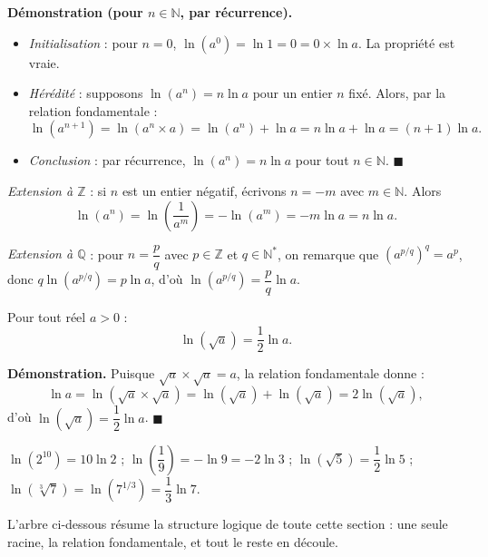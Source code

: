 \documentclass[11pt]{article}
\begin{document}
\textbf{Démonstration (pour $n \in \mathbb{N}$, par récurrence).}
\begin{itemize}
\item \emph{Initialisation} : pour $n = 0$, $\ln(a^0) = \ln 1 = 0 = 0 \times \ln a$. La propriété est vraie.
\item \emph{Hérédité} : supposons $\ln(a^n) = n\ln a$ pour un entier $n$ fixé. Alors, par la relation fondamentale :
\[
\ln(a^{n+1}) = \ln(a^n \times a) = \ln(a^n) + \ln a = n\ln a + \ln a = (n+1)\ln a.
\]
\item \emph{Conclusion} : par récurrence, $\ln(a^n) = n\ln a$ pour tout $n \in \mathbb{N}$. \hfill$\blacksquare$
\end{itemize}

\emph{Extension à $\mathbb{Z}$} : si $n$ est un entier négatif, écrivons $n = -m$ avec $m \in \mathbb{N}$. Alors
\[
\ln(a^n) = \ln\left(\frac{1}{a^m}\right) = -\ln(a^m) = -m\ln a = n\ln a.
\]

\emph{Extension à $\mathbb{Q}$} : pour $n = \dfrac{p}{q}$ avec $p \in \mathbb{Z}$ et $q \in \mathbb{N}^*$, on remarque que $\left(a^{p/q}\right)^q = a^p$, donc $q\ln\left(a^{p/q}\right) = p\ln a$, d'où $\ln\left(a^{p/q}\right) = \dfrac{p}{q}\ln a$.

\begin{propriete}
Pour tout réel $a > 0$ :
\[
\ln(\sqrt{a}) = \frac{1}{2}\ln a.
\]
\end{propriete}

\textbf{Démonstration.} Puisque $\sqrt{a} \times \sqrt{a} = a$, la relation fondamentale donne :
\[
\ln a = \ln(\sqrt{a} \times \sqrt{a}) = \ln(\sqrt{a}) + \ln(\sqrt{a}) = 2\ln(\sqrt{a}),
\]
d'où $\ln(\sqrt{a}) = \dfrac{1}{2}\ln a$. \hfill$\blacksquare$

\begin{exemplebox}
$\ln(2^{10}) = 10\ln 2$ ; $\ln\left(\dfrac{1}{9}\right) = -\ln 9 = -2\ln 3$ ; $\ln(\sqrt{5}) = \dfrac{1}{2}\ln 5$ ; $\ln(\sqrt[3]{7}) = \ln\left(7^{1/3}\right) = \dfrac{1}{3}\ln 7$.
\end{exemplebox}

L'arbre ci-dessous résume la structure logique de toute cette section : une seule racine, la relation fondamentale, et tout le reste en découle.
\end{document}
